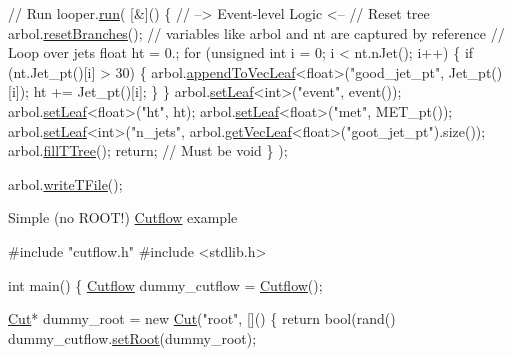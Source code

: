 \begin{DoxyEnumerate}
\begin{DoxyCode}
\textcolor{comment}{// Run}
looper.\hyperlink{classLooper_abfa564ca48778da1f58c8a6444ddd463}{run}(
    [&]()
    \{
        \textcolor{comment}{// --> Event-level Logic <--}
        \textcolor{comment}{// Reset tree}
        arbol.\hyperlink{classArbol_a4c2184d378ab21a9627a57098291a7c4}{resetBranches}(); \textcolor{comment}{// variables like arbol and nt are captured by reference}
        \textcolor{comment}{// Loop over jets}
        \textcolor{keywordtype}{float} ht = 0.;
        \textcolor{keywordflow}{for} (\textcolor{keywordtype}{unsigned} \textcolor{keywordtype}{int} i = 0; i < nt.nJet(); i++) 
        \{
            \textcolor{keywordflow}{if} (nt.Jet\_pt()[i] > 30)
            \{
                arbol.\hyperlink{classArbol_a811156c9134ca7e0015bbe2ab95434b0}{appendToVecLeaf}<\textcolor{keywordtype}{float}>(\textcolor{stringliteral}{"good\_jet\_pt"}, Jet\_pt()[i]);
                ht += Jet\_pt()[i];
            \}
        \}
        arbol.\hyperlink{classArbol_a7a8d3bec0bf5c00635a0b00fcd63cf01}{setLeaf}<\textcolor{keywordtype}{int}>(\textcolor{stringliteral}{"event"}, event());
        arbol.\hyperlink{classArbol_a7a8d3bec0bf5c00635a0b00fcd63cf01}{setLeaf}<\textcolor{keywordtype}{float}>(\textcolor{stringliteral}{"ht"}, ht);
        arbol.\hyperlink{classArbol_a7a8d3bec0bf5c00635a0b00fcd63cf01}{setLeaf}<\textcolor{keywordtype}{float}>(\textcolor{stringliteral}{"met"}, MET\_pt());
        arbol.\hyperlink{classArbol_a7a8d3bec0bf5c00635a0b00fcd63cf01}{setLeaf}<\textcolor{keywordtype}{int}>(\textcolor{stringliteral}{"n\_jets"}, arbol.\hyperlink{classArbol_a634be85d92f5f26403407952b10a29fd}{getVecLeaf}<\textcolor{keywordtype}{float}>(\textcolor{stringliteral}{"goot\_jet\_pt"}).size());
        arbol.\hyperlink{classArbol_a1d029dd97a0451281c774b578d93bcda}{fillTTree}();
        \textcolor{keywordflow}{return}; \textcolor{comment}{// Must be void}
    \}
);

arbol.\hyperlink{classArbol_ade7d835bbe383a70006e86785ae5672c}{writeTFile}();
\end{DoxyCode}

\item Simple (no R\+O\+O\+T!) \hyperlink{classCutflow}{Cutflow} example 
\begin{DoxyCode}
\textcolor{preprocessor}{#include "cutflow.h"}
\textcolor{preprocessor}{#include <stdlib.h>}

\textcolor{keywordtype}{int} main()
\{
    \hyperlink{classCutflow}{Cutflow} dummy\_cutflow = \hyperlink{classCutflow}{Cutflow}();

    \hyperlink{classCut}{Cut}* dummy\_root = \textcolor{keyword}{new} \hyperlink{classCut}{Cut}(\textcolor{stringliteral}{"root"}, []() \{ \textcolor{keywordflow}{return} bool(rand() %
    dummy\_cutflow.\hyperlink{classCutflow_ad27d37141c3748779a5d81fad919ecbb}{setRoot}(dummy\_root);


\end{DoxyCode}
\end{DoxyEnumerate}
